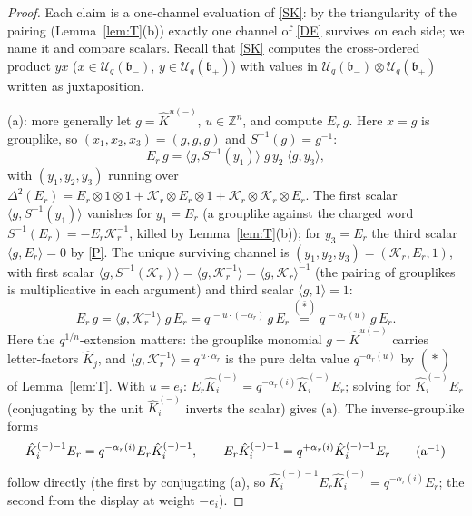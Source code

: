 \documentclass[11pt]{article}
\theoremstyle{definition}
\theoremstyle{remark}
\newcommand{\la}{\langle}
\newcommand{\ra}{\rangle}
\newcommand{\Z}{\mathbb{Z}}
\newcommand{\Uq}{\mathcal{U}_q}
\newcommand{\bp}{\mathfrak{b}_+}
\newcommand{\bm}{\mathfrak{b}_-}
\newcommand{\hK}{\hat K}
\newcommand{\cK}{\mathcal K}
\begin{document}
\begin{proof}
Each claim is a one-channel evaluation of \eqref{SK}: by the
triangularity of the pairing (Lemma~\ref{lem:T}(b)) exactly one
channel of \eqref{DE} survives on each side; we name it and compare
scalars.  Recall that \eqref{SK} computes the cross-ordered product
$yx$ ($x\in\Uq(\bm)$, $y\in\Uq(\bp)$) with values in
$\Uq(\bm)\otimes\Uq(\bp)$ written as juxtaposition.

(a): more generally let $g=\hK^{u(-)}$, $u\in\Z^n$, and compute
$E_r\,g$.  Here $x=g$ is grouplike, so
$(x_1,x_2,x_3)=(g,g,g)$ and $S^{-1}(g)=g^{-1}$:
\[
E_r\,g=\la g,S^{-1}(y_1)\ra\;g\,y_2\;\la g,y_3\ra ,
\]
with $(y_1,y_2,y_3)$ running over
$\Delta^2(E_r)=E_r\otimes1\otimes1+\cK_r\otimes E_r\otimes1
+\cK_r\otimes\cK_r\otimes E_r$.
The first scalar $\la g,S^{-1}(y_1)\ra$ vanishes for $y_1=E_r$ (a
grouplike against the charged word $S^{-1}(E_r)=-E_r\cK_r^{-1}$, killed
by Lemma~\ref{lem:T}(b)); for $y_3=E_r$ the third scalar
$\la g,E_r\ra=0$ by \eqref{P}.  The unique surviving channel is
$(y_1,y_2,y_3)=(\cK_r,E_r,1)$, with first scalar
$\la g,S^{-1}(\cK_r)\ra=\la g,\cK_r^{-1}\ra=\la g,\cK_r\ra^{-1}$
(the pairing of grouplikes is multiplicative in each argument) and
third scalar $\la g,1\ra=1$:
\[
E_r\,g=\la g,\cK_r^{-1}\ra\;g\,E_r
=q^{\,-u\cdot(-\alpha_r)}\,g\,E_r
\overset{(\bar\ast)}{=}q^{\,-\alpha_r(u)}\,g\,E_r .
\]
Here the $q^{1/n}$-extension matters: the grouplike monomial
$g=\hK^{u(-)}$ carries letter-factors $\hK_j$, and
$\la g,\cK_r^{-1}\ra=q^{\,u\cdot\alpha_r}$ is the pure delta value
$q^{-\alpha_r(u)}$ by $(\bar\ast)$ of Lemma~\ref{lem:T}.  With $u=e_i$:
$E_r\hK_i^{(-)}=q^{-\alpha_r(i)}\hK_i^{(-)}E_r$; solving for
$\hK_i^{(-)}E_r$ (conjugating by the unit $\hK_i^{(-)}$ inverts the
scalar) gives (a).  The inverse-grouplike forms
\begin{equation}
\hK_i^{(-)-1}E_r=q^{-\alpha_r(i)}E_r\hK_i^{(-)-1},\qquad
E_r\hK_i^{(-)-1}=q^{+\alpha_r(i)}\hK_i^{(-)-1}E_r
\label{aInv}\tag{a$^{-1}$}
\end{equation}
follow directly (the first by conjugating (a), so
$\hK_i^{(-)-1}E_r\hK_i^{(-)}=q^{-\alpha_r(i)}E_r$; the second from the
display at weight $-e_i$).


\end{proof}
\end{document}
